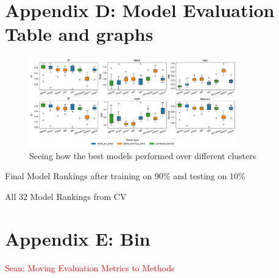 \documentclass[10pt]{article}
\newcommand{\Sean}[1]{{\textcolor{red}{{Sean: #1}} }}
\begin{document}
\section{Appendix D: Model Evaluation Table and graphs}
\label{appendix:D}

\begin{figure}[H]
    \centering
    \includegraphics[width=0.8\textwidth]{LatexPlots/CV_plots/boxplots.png}
    \caption{Seeing how the best models performed over different clusters}
    \label{fig:boxplots}
\end{figure}

\begin{table}[H]
    \centering
    \caption{Final Model Rankings after training on 90\% and testing on 10\%}
    {\fontsize{7}{9.5}\selectfont
    }
    \label{tab:finalmadelsrankingtable}
\end{table}



\begin{table}[H]
    \centering
    \caption{All 32 Model Rankings from CV}
    {\fontsize{7}{9.5}\selectfont
    }
    \label{tab:rankingtable}
\end{table}
    

\section{Appendix E: Bin}
\label{appendix:bin}
\Sean{Moving Evaluation Metrics to Methods}
\end{document}
